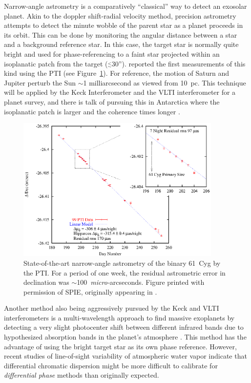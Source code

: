 \documentclass[12pt]{iopart}
\newcommand{\simle}{\mbox{$\stackrel{<}{_{\sim}}$}}
\begin{document}
Narrow-angle astrometry is a comparatively ``classical'' way to detect
an exosolar planet. Akin to the doppler shift-radial velocity method,
precision astrometry attempts to detect the minute wobble of the
parent star as a planet proceeds in its orbit.  This can be done by
monitoring the angular distance between a star and a background
reference star.  In this case, the target star is normally quite
bright and used for phase-referencing to a faint star projected within
an isoplanatic patch from the target ($\simle$30'').
\citet{lane2000a} reported the first measurements of this kind using
the PTI (see
Figure~\ref{ptifig}).  For reference, the motion of Saturn and Jupiter
perturb the Sun $\sim$1 milliarcsecond as viewed from 10~pc.  This
technique will be applied by the Keck Interferometer and the VLTI
interferometer for a planet survey, and there is talk of pursuing this
in Antarctica where the isoplanatic patch is larger and the coherence
times longer \citep[e.g.,][]{lloyd2002,swain2002}.

\begin{figure}
\begin{center}
\includegraphics[clip,width=4in]{Figures/JDM_ptifig.eps}
\caption
{State-of-the-art narrow-angle astrometry of the binary
61~Cyg by the PTI. For a period of one week,
the residual astrometric error in declination was 
$\sim$100~{\em micro-}arcseconds. Figure printed with permission
of SPIE, originally appearing in \citet{lane2000a}.
\label{ptifig}}
\end{center}
\end{figure}

Another method also being aggressively pursued by the Keck and VLTI
interferometers is a multi-wavelength approach to find massive
exoplanets by detecting a very slight photocenter shift between
different infrared bands due to hypothesized absorption bands in the
planet's atmosphere \citep[i.e., the {\em differential phase} method;
e.g.,][]{as1999, lopez2000}.  This method has the advantage of using
the bright target star as its own phase reference.  However, recent
studies of line-of-sight variability of atmospheric water vapor
\citep{akeson2000b} indicate that differential chromatic dispersion
might be more difficult to calibrate for {\em differential phase}
methods than originally expected.
\end{document}
